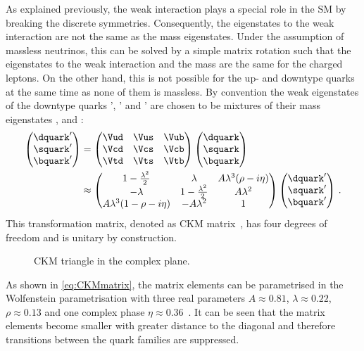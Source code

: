 As explained previously, the weak interaction plays a special role in the \ac{SM} by breaking the discrete symmetries.
Consequently, the eigenstates to the weak interaction are not the same as the mass eigenstates.
Under the assumption of massless neutrinos, this can be solved by a simple matrix rotation such that the eigenstates to the weak interaction and the mass are the same for the charged leptons.
On the other hand, this is not possible for the up- and downtype quarks at the same time as none of them is massless.
By convention the weak eigenstates of the downtype quarks \dquark', \squark' and \bquark' are chosen to be mixtures of their mass eigenstates \dquark, \squark and \bquark:
\begin{align}
\begin{pmatrix} \dquark' \\ \squark' \\ \bquark' \end{pmatrix}
&= \begin{pmatrix} \Vud & \Vus & \Vub \\ \Vcd & \Vcs & \Vcb \\ \Vtd & \Vts & \Vtb \end{pmatrix}
\begin{pmatrix} \dquark \\ \squark \\ \bquark \end{pmatrix}\nonumber \\
&\approx \begin{pmatrix} 1-\frac{\lambda^2}{2} & \lambda & A\lambda^3(\rho-i\eta) \\
                        -\lambda & 1-\frac{\lambda^2}{2} & A\lambda^2 \\
                        A\lambda^3(1-\rho-i\eta) & -A\lambda^2 & 1 \end{pmatrix}
\begin{pmatrix} \dquark' \\ \squark' \\ \bquark' \end{pmatrix}\,. \label{eq:CKMmatrix}
\end{align}
This transformation matrix, denoted as CKM matrix~\cite{Kobayashi:1973fv,PhysRevLett.10.531}, has four degrees of freedom and is unitary by construction.
\begin{figure}[tbp]
	\centering
	
	\caption{CKM triangle in the complex plane.}
	\label{fig:ckmtheory}
\end{figure}
As shown in \cref{eq:CKMmatrix}, the matrix elements can be parametrised in the Wolfenstein parametrisation \cite{Wolfenstein:1983yz} with three real parameters $A\approx0.81$, $\lambda\approx0.22$, $\rho\approx0.13$ \cite{PDG2018} and one complex phase \mbox{$\eta\approx0.36$~\cite{PDG2018}}.
It can be seen that the matrix elements become smaller with greater distance to the diagonal and therefore transitions between the quark families are suppressed.

